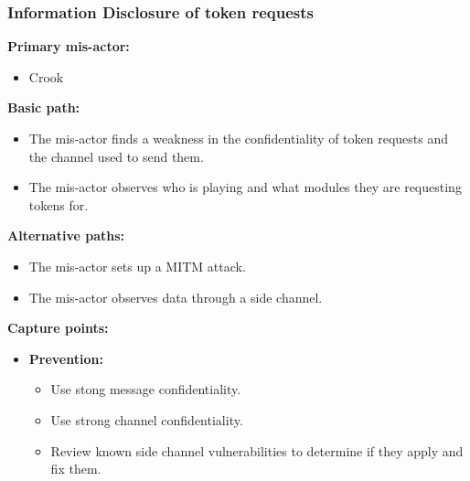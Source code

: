 \documentclass[a4paper,11pt]{report}
\begin{document}
\subsubsection{Information Disclosure of token requests}
\textbf{Primary mis-actor:}
\begin{itemize}
\item Crook
\end{itemize}
\textbf{Basic path:}
\begin{itemize}
\item The mis-actor finds a weakness in the confidentiality of token requests and the channel used to send them.
\item The mis-actor observes who is playing and what modules they are requesting tokens for.
\end{itemize}
\textbf{Alternative paths:}
\begin{itemize}
\item The mis-actor sets up a MITM attack.
\item The mis-actor observes data through a side channel.
\end{itemize}
\textbf{Capture points:}
\begin{itemize}
\item \textbf{Prevention:}
\begin{itemize}
\item Use stong message confidentiality.
\item Use strong channel confidentiality.
\item Review known side channel vulnerabilities to determine if they apply and fix them.
\end{itemize}
\end{itemize}
\end{document}
